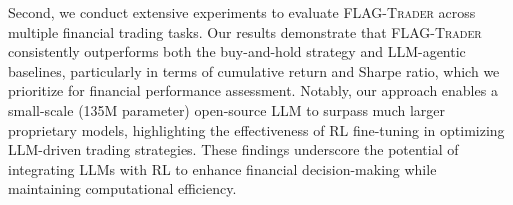 Second, we conduct extensive experiments to evaluate \textsc{FLAG-Trader} across multiple financial trading tasks. Our results demonstrate that \textsc{FLAG-Trader} consistently outperforms both the buy-and-hold strategy and LLM-agentic baselines, particularly in terms of cumulative return and Sharpe ratio, which we prioritize for financial performance assessment. Notably, our approach enables a small-scale (135M parameter) open-source LLM to surpass much larger proprietary models, highlighting the effectiveness of RL fine-tuning in optimizing LLM-driven trading strategies. These findings underscore the potential of integrating LLMs with RL to enhance financial decision-making while maintaining computational efficiency.



